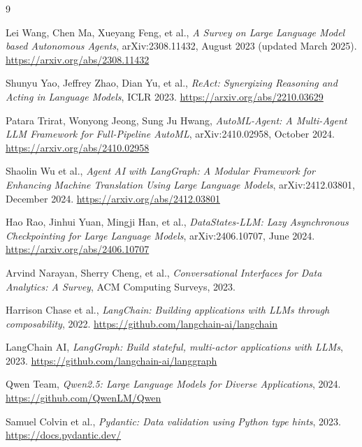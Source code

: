 \documentclass[11pt,a4paper]{article}
\begin{document}
\newpage
\begin{thebibliography}{9}

Lei Wang, Chen Ma, Xueyang Feng, et al., \textit{A Survey on Large Language Model based Autonomous Agents}, arXiv:2308.11432, August 2023 (updated March 2025).
\url{https://arxiv.org/abs/2308.11432}

Shunyu Yao, Jeffrey Zhao, Dian Yu, et al., \textit{ReAct: Synergizing Reasoning and Acting in Language Models}, ICLR 2023.
\url{https://arxiv.org/abs/2210.03629}

Patara Trirat, Wonyong Jeong, Sung Ju Hwang, \textit{AutoML-Agent: A Multi-Agent LLM Framework for Full-Pipeline AutoML}, arXiv:2410.02958, October 2024.
\url{https://arxiv.org/abs/2410.02958}

Shaolin Wu et al., \textit{Agent AI with LangGraph: A Modular Framework for Enhancing Machine Translation Using Large Language Models}, arXiv:2412.03801, December 2024.
\url{https://arxiv.org/abs/2412.03801}

Hao Rao, Jinhui Yuan, Mingji Han, et al., \textit{DataStates-LLM: Lazy Asynchronous Checkpointing for Large Language Models}, arXiv:2406.10707, June 2024.
\url{https://arxiv.org/abs/2406.10707}

Arvind Narayan, Sherry Cheng, et al., \textit{Conversational Interfaces for Data Analytics: A Survey}, ACM Computing Surveys, 2023.

Harrison Chase et al., \textit{LangChain: Building applications with LLMs through composability}, 2022.
\url{https://github.com/langchain-ai/langchain}

LangChain AI, \textit{LangGraph: Build stateful, multi-actor applications with LLMs}, 2023.
\url{https://github.com/langchain-ai/langgraph}

Qwen Team, \textit{Qwen2.5: Large Language Models for Diverse Applications}, 2024.
\url{https://github.com/QwenLM/Qwen}

Samuel Colvin et al., \textit{Pydantic: Data validation using Python type hints}, 2023.
\url{https://docs.pydantic.dev/}

\end{thebibliography}
\end{document}
